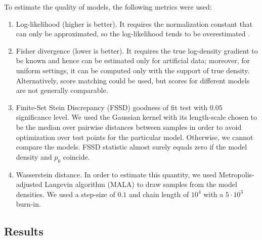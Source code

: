 To estimate the quality of models, the following metrics were used:
\begin{enumerate}
    \item Log-likelihood (higher is better).
    It requires the normalization constant that can only be approximated, so
    the log-likelihood tends to be overestimated \cite{GrettonDeep}.
    \item Fisher divergence (lower is better).
    It requires the true log-density gradient to be known and hence can be estimated only for
    artificial data; moreover, for uniform settings, it can be computed only with  the support of
    true density.
    Alternatively, score matching could be used, but scores for different models
    are not generally comparable.
    \item Finite-Set Stein Discrepancy (FSSD) goodness of fit test \cite{FSSD, GOF} with $0.05$
    significance level.
    We used the Gaussian kernel with its length-scale chosen to be the median over
    pairwise distances between samples in order to avoid optimization over test points for the
    particular model. Otherwise, we cannot compare the models.
    FSSD statistic almost surely equals zero if the model density and $p_0$
    coincide.
    \item Wasserstein distance.
    In order to estimate this quantity, we used Metropolis-adjusted Langevin algorithm (MALA)
    \cite{MALA} to draw samples from the model densities.
    We used a step-size of $0.1$ and chain length of $10^4$ with a $5\cdot 10^3$ burn-in.
\end{enumerate}

\subsection{Results}

